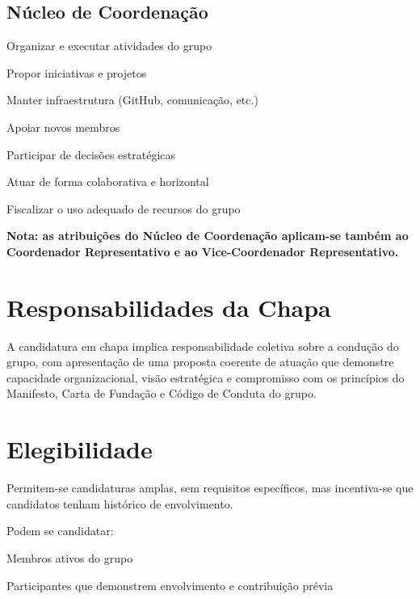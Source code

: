 \documentclass[
  12pt,          %
  a4paper,       %
  oneside,       %
  brazil         %
]{article}
\begin{document}
\subsection{Núcleo de Coordenação}

\begin{conduta}
	\item Organizar e executar atividades do grupo
	\item Propor iniciativas e projetos
	\item Manter infraestrutura (GitHub, comunicação, etc.)
	\item Apoiar novos membros
	\item Participar de decisões estratégicas
	\item Atuar de forma colaborativa e horizontal
	\item Fiscalizar o uso adequado de recursos do grupo
	
    \textbf{Nota: as atribuições do Núcleo de Coordenação aplicam-se também ao Coordenador Representativo e ao Vice-Coordenador Representativo.}
\end{conduta}

\section{Responsabilidades da Chapa}

A candidatura em chapa implica responsabilidade coletiva sobre a condução do grupo, com apresentação de uma proposta coerente de atuação que demonstre 
capacidade organizacional, visão estratégica e compromisso com os princípios do Manifesto, Carta de Fundação e Código de Conduta do grupo.

\section{Elegibilidade}

Permitem-se candidaturas amplas, sem requisitos específicos, mas incentiva-se que candidatos tenham histórico de envolvimento.

Podem se candidatar:

\begin{conduta}
	\item Membros ativos do grupo
	\item Participantes que demonstrem envolvimento e contribuição prévia
\end{conduta}
\end{document}
